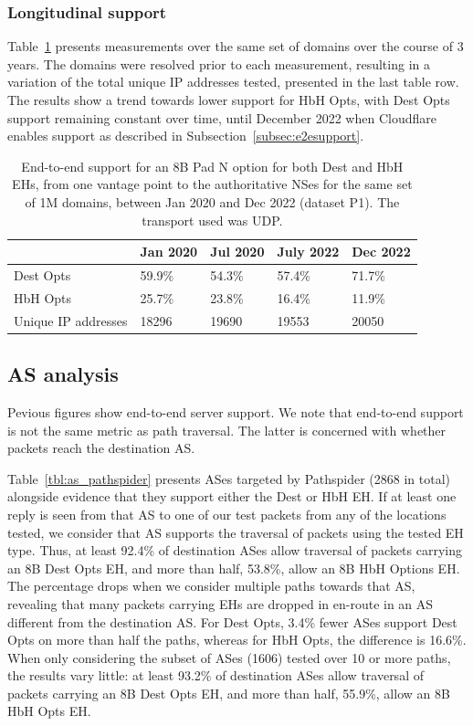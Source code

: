 \documentclass[conference]{IEEEtran}
\begin{document}
\subsubsection{Longitudinal support}

Table~\ref{tbl:longitudinal_support} presents measurements over the same set of domains over the course of 3 years. The domains were resolved prior to each measurement, resulting in a variation of the total unique IP addresses tested, presented in the last table row. The results show a trend towards lower support for HbH Opts, with Dest Opts support remaining constant over time, until December 2022 when Cloudflare enables support as described in Subsection~\ref{subsec:e2esupport}.

\begin{table}[]
\begin{tabular}{l|l|l|l|l}
                    & Jan 2020 & Jul 2020 & July 2022 & Dec 2022 \\
\hline
Dest Opts & 59.9\%   & 54.3\%   & 57.4\%    & 71.7\%   \\
HbH Opts  & 25.7\%   & 23.8\%   & 16.4\%    & 11.9\%   \\
\hline
Unique IP addresses & 18296    & 19690    & 19553     & 20050   
\end{tabular}
\label{tbl:longitudinal_support}
\caption{End-to-end support for an 8B Pad N option for both Dest and HbH EHs, from one vantage point to the authoritative NSes for the same set of 1M domains, between Jan 2020 and Dec 2022 (dataset P1). The transport used was UDP.}
\end{table}

\subsection{AS analysis }

Pevious figures show end-to-end server support. We note that end-to-end support is not the same metric as path traversal. The latter is concerned with whether packets reach the destination AS.

Table~\ref{tbl:as_pathspider} presents ASes targeted by Pathspider (2868 in total) alongside evidence that they support either the Dest or HbH EH.
If at least one reply is seen from that AS to one of our test packets from any of the locations tested, we consider that AS supports the traversal of packets using the tested EH type. Thus, at least 92.4\% of destination ASes allow traversal of packets carrying an 8B Dest Opts EH, and more than half, 53.8\%, allow an 8B HbH Options EH. The percentage drops when we consider multiple paths towards that AS, revealing that many packets carrying EHs are dropped in en-route in an AS different from the destination AS. For Dest Opts, 3.4\% fewer ASes support Dest Opts on more than half the paths, whereas for HbH Opts, the difference is 16.6\%.
When only considering the subset of ASes (1606) tested over 10 or more paths, the results vary little: at least 93.2\% of destination ASes allow traversal of packets carrying an 8B Dest Opts EH, and more than half, 55.9\%, allow an 8B HbH Opts EH.
\end{document}
